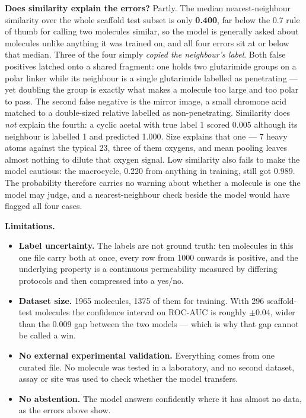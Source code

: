 \documentclass[10pt]{article}
\begin{document}
\textbf{Does similarity explain the errors?} Partly. The median nearest-neighbour similarity over the whole scaffold
test subset is only \textbf{0.400}, far below the 0.7 rule of thumb for calling two molecules similar, so the model
is generally asked about molecules unlike anything it was trained on, and all four errors sit at or below that
median. Three of the four simply \emph{copied the neighbour's label}. Both false positives latched onto a shared
fragment: one holds two glutarimide groups on a polar linker while its neighbour is a single glutarimide labelled as
penetrating --- yet doubling the group is exactly what makes a molecule too large and too polar to pass. The second
false negative is the mirror image, a small chromone acid matched to a double-sized relative labelled as
non-penetrating. Similarity does \emph{not} explain the fourth: a cyclic acetal with true label 1 scored 0.005
although its neighbour is labelled 1 and predicted 1.000. Size explains that one --- 7 heavy atoms against the
typical 23, three of them oxygens, and mean pooling leaves almost nothing to dilute that oxygen signal. Low
similarity also fails to make the model cautious: the macrocycle, 0.220 from anything in training, still got 0.989.
The probability therefore carries no warning about whether a molecule is one the model may judge, and a
nearest-neighbour check beside the model would have flagged all four cases.

\textbf{Limitations.}
\begin{itemize}
    \item \textbf{Label uncertainty.} The labels are not ground truth: ten molecules in this one file carry both at once, every row from 1000 onwards is positive, and the underlying property is a continuous permeability measured by differing protocols and then compressed into a yes/no.
    \item \textbf{Dataset size.} 1965 molecules, 1375 of them for training. With 296 scaffold-test molecules the confidence interval on ROC-AUC is roughly $\pm 0.04$, wider than the 0.009 gap between the two models --- which is why that gap cannot be called a win.
    \item \textbf{No external experimental validation.} Everything comes from one curated file. No molecule was tested in a laboratory, and no second dataset, assay or site was used to check whether the model transfers.
    \item \textbf{No abstention.} The model answers confidently where it has almost no data, as the errors above show.
\end{itemize}
\end{document}
